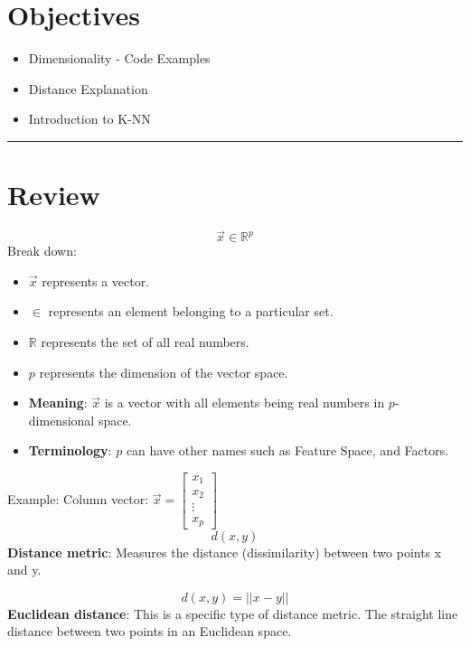 \section*{Objectives}
\begin{itemize}
  \item Dimensionality - Code Examples
  \item Distance Explanation
  \item Introduction to K-NN
  \end{itemize}

\rule[0.0051in]{\textwidth}{0.00025in}

\section{Review}
\[
\vec{x} \in {\mathbb{R}}^p
\]
Break down: 
\begin{itemize}
    \item $\vec{x}$ represents a vector. 
    \item $\in$ represents an element belonging to a particular set. 
    \item $\mathbb{R}$ represents the set of all real numbers. 
    \item $p$ represents the dimension of the vector space. 
    \item \textbf{Meaning}: $\vec{x}$ is a vector with all elements being real numbers in $p$-dimensional space. 
    \item \textbf{Terminology}: $p$ can have other names such as Feature Space, and Factors.
\end{itemize}

Example: Column vector:
$\vec{x} = \begin{bmatrix}
x_1 \\
x_2 \\
\vdots \\
x_p
\end{bmatrix}$ \\

\[
    d(x,y)
\]
\textbf{Distance metric}: Measures the distance (dissimilarity) between two points x and y. 

\[
    d(x,y) = ||x-y||
\]
\textbf{Euclidean distance}: This is a specific type of distance metric. The straight line distance between two points in an Euclidean space. 

